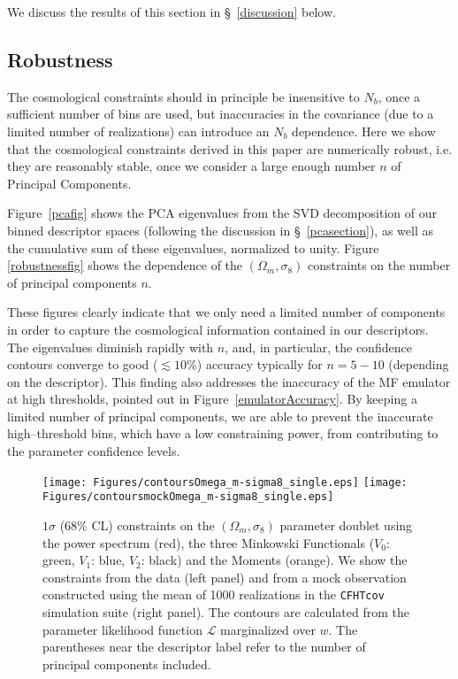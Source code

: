 \documentclass[reprint,aps,prd,superscriptaddress,showkeys,showpacs]{revtex4-1}
\begin{document}
We discuss the results of this section in \S~\ref{discussion} below.


\subsection{Robustness}

The cosmological constraints should in principle be insensitive to
$N_b$, once a sufficient number of bins are used, but inaccuracies in
the covariance (due to a limited number of realizations) can introduce
an $N_b$ dependence.  Here we show that the cosmological constraints
derived in this paper are numerically robust, i.e. they are reasonably
stable, once we consider a large enough number $n$ of Principal
Components. 

Figure~\ref{pcafig} shows the PCA eigenvalues from the SVD
decomposition of our binned descriptor spaces (following the
discussion in \S~\ref{pcasection}), as well as the cumulative sum of
these eigenvalues, normalized to unity. Figure \ref{robustnessfig}
shows the dependence of the $(\Omega_m,\sigma_8)$ constraints on the
number of principal components $n$.  

These figures clearly indicate that we only need a limited number of
components in order to capture the cosmological information contained
in our descriptors. The eigenvalues diminish rapidly with $n$, and, in
particular, the confidence contours converge to good ($\lesssim 10\%$)
accuracy typically for $n=5-10$ (depending on the descriptor).
This finding also addresses the inaccuracy of the MF emulator at high
thresholds, pointed out in Figure~\ref{emulatorAccuracy}. By keeping a
limited number of principal components, we are able to prevent the
inaccurate high--threshold bins, which have a low constraining power,
from contributing to the parameter confidence levels.

\begin{figure*}
\begin{center}
\texttt{[image: Figures/contoursOmega\_m-sigma8\_single.eps]}
\texttt{[image: Figures/contoursmockOmega\_m-sigma8\_single.eps]}
\end{center}
\caption{$1\sigma$ (68\% CL) constraints on the $(\Omega_m,\sigma_8)$
  parameter doublet using the power spectrum (red), the three
  Minkowski Functionals ($V_0$: green, $V_1$: blue, $V_2$: black) and
  the Moments (orange). We show the constraints from the data (left
  panel) and from a mock observation constructed using the mean of
  1000 realizations in the \texttt{CFHTcov} simulation suite (right
  panel). The contours are calculated from the parameter likelihood
  function $\mathcal{L}$ marginalized over $w$. The parentheses near
  the descriptor label refer to the number of principal components
  included.}
\label{contours3single}
\end{figure*}
\end{document}
